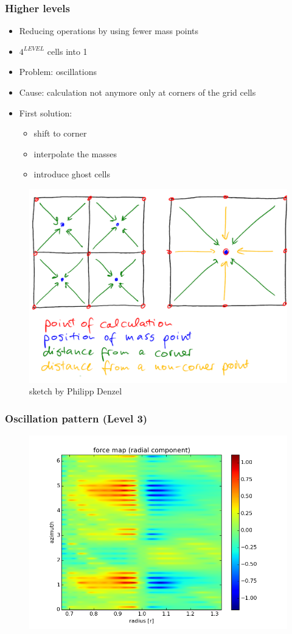\documentclass{beamer}
\begin{document}
\begin{frame}
 \frametitle{Higher levels}
 \begin{itemize}
  \item Reducing operations by using fewer mass points 
  \item $4^{LEVEL}$ cells into 1
  \item Problem: oscillations
  \item Cause: calculation not anymore only at corners of the grid cells
  \item First solution:
  \begin{itemize}
   \item shift to corner
   \item interpolate the masses
   \item introduce ghost cells
  \end{itemize}
 \end{itemize}
 \begin{figure}[H]
  \centering
  \includegraphics[width=.49\textwidth]{reimagined_sketch1.pdf}
  \caption{sketch by Philipp Denzel}
\end{figure}
\end{frame}
\begin{frame}
 \frametitle{Oscillation pattern (Level 3)}
 \begin{figure}[H]
  \centering
  \includegraphics[width=.8\textwidth]{radial_force_lvl3.png}
 \end{figure} 
\end{frame}
\end{document}

